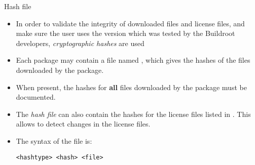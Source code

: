 \begin{frame}[fragile]{Hash file}

  \begin{itemize}

  \item In order to validate the integrity of downloaded files and
    license files, and make sure the user uses the version which was
    tested by the Buildroot developers, {\em cryptographic hashes} are
    used

  \item Each package may contain a file named ,
    which gives the hashes of the files downloaded by the package.

  \item When present, the hashes for {\bf all} files downloaded by the
    package must be documented.

  \item The {\em hash file} can also contain the hashes for the
    license files listed in . This allows to
    detect changes in the license files.

  \item The syntax of the file is:
    \begin{block}{}
      {\tiny
\begin{verbatim}
<hashtype> <hash> <file>
\end{verbatim}
      }
    \end{block}
  \end{itemize}
\end{frame}

